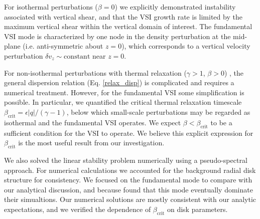For isothermal perturbations ($\beta=0$) we explicitly
demonstrated instability  associated with vertical shear, and that the 
VSI growth rate is limited by the maximum vertical shear within the 
vertical domain of interest. The fundamental VSI mode is characterized
by one node in the density perturbation at the mid-plane
(i.e. anti-symmetric about $z=0$), which corresponds to a vertical
velocity perturbation  $\delta v_z\sim\mathrm{constant}$ near
$z=0$. 


For non-isothermal  perturbations with thermal relaxation ($\gamma>1$,
$\beta>0$) , the general dispersion relation (Eq. \ref{relax_disp}) is
complicated and requires a numerical treatment. However, for the 
fundamental VSI some simplification is  possible. In particular, we
quantified the critical thermal relaxation timescale
$\beta_\mathrm{crit}=\epsilon|q|/(\gamma-1)$, below which small-scale
perturbations may be regarded as isothermal and the fundamental VSI
operates.  We expect $\beta<\beta_\mathrm{crit}$ to be a sufficient
condition for the VSI to operate. We believe this explicit expression for
$\beta_\mathrm{crit}$ is the most useful result from our
investigation.  

We also solved the linear stability problem numerically using a
pseudo-spectral approach. For numerical calculations we accounted for
the background radial disk structure for consistency. We focused
on the fundamental mode to compare with our analytical
discussion, and because \cite{nelson13} found that this mode 
eventually dominate their simualtions. Our numerical solutions are
mostly consistent with our analytic expectations, and we verified the
dependence of $\beta_\mathrm{crit}$ on disk parameters. 


